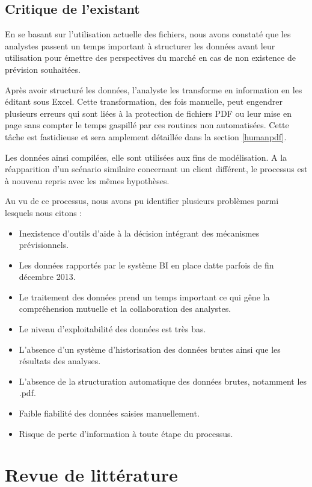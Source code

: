 \subsection{Critique de l'existant}
En se basant sur l’utilisation actuelle des fichiers, nous avons constaté que les analystes passent un temps important à structurer les données avant leur utilisation pour émettre des perspectives du marché en cas de non existence de prévision souhaitées.
\par
Après avoir structuré les données, l’analyste les transforme en information en les éditant sous Excel. Cette transformation, des fois manuelle, peut engendrer plusieurs erreurs qui sont liées à la protection de fichiers PDF ou leur mise en page sans compter le temps gaspillé par ces routines non automatisées. Cette tâche est fastidieuse et sera amplement détaillée dans la section \ref{humanpdf}.
\par
Les données ainsi compilées, elle sont utilisées aux fins de modélisation. A la réapparition d'un scénario similaire concernant un client différent, le processus est à nouveau repris avec les mêmes hypothèses.
\par
Au vu de ce processus, nous avons pu identifier plusieurs problèmes parmi lesquels nous citons :
\begin{itemize}
	\item Inexistence d'outils d'aide à la décision intégrant des mécanismes prévisionnels.
	\item Les données rapportés par le système BI en place datte parfois de fin décembre 2013.
	\item Le traitement des données prend un temps important ce qui gêne la compréhension
mutuelle et la collaboration des analystes.
	\item Le niveau d'exploitabilité des données est très bas.
	\item L’absence d’un système d’historisation des données brutes ainsi que les résultats des
analyses.
	\item L’absence de la structuration automatique des données brutes, notamment les .pdf.
	\item Faible fiabilité des données saisies manuellement.
	\item Risque de perte d’information à toute étape du processus.
\end{itemize}
\section{Revue de littérature}
